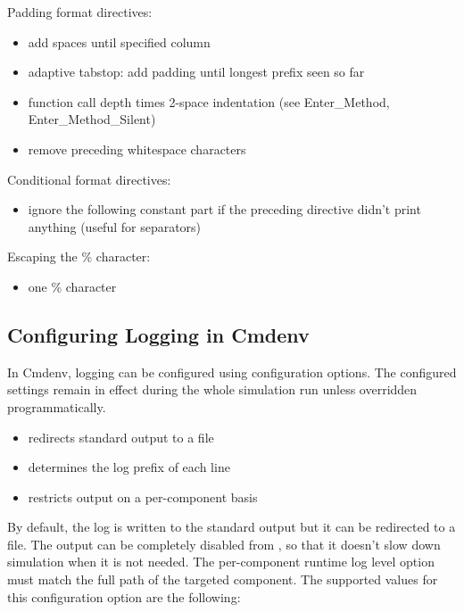 Padding format directives:
\begin{itemize}
  \item \ttt{\%[0-9]+} add spaces until specified column
  \item \ttt{\%|} adaptive tabstop: add padding until longest prefix seen so far
  \item \ttt{\%>} function call depth times 2-space indentation (see Enter\_Method, Enter\_Method\_Silent)
  \item \ttt{\%<} remove preceding whitespace characters
\end{itemize}

Conditional format directives:
\begin{itemize}
  \item {} ignore the following constant part if the preceding directive didn't print anything (useful for separators)
\end{itemize}

Escaping the \% character:
\begin{itemize}
  \item \ttt{\%\%} one \% character
\end{itemize}

\subsection{Configuring Logging in Cmdenv}
\label{sec:config-sim:configuring-logging-in-cmdenv}

In Cmdenv, logging can be configured using  configuration
options. The configured settings remain in effect during the whole simulation run
unless overridden programmatically.

\begin{itemize}
  \item {} redirects standard output to a file
  \item {} determines the log prefix of each line
  \item {} restricts output on a per-component basis
\end{itemize}

By default, the log is written to the standard output but it can be redirected to
a file. The output can be completely disabled from , so
that it doesn't slow down simulation when it is not needed. The per-component
runtime log level option must match the full path of the targeted component. The
supported values for this configuration option are the following:

